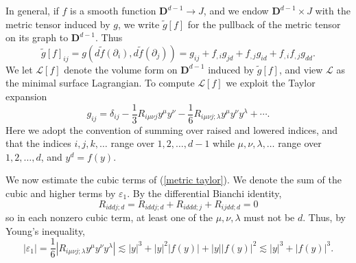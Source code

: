 \documentclass[reqno,12pt,letterpaper]{amsart}
\newcommand{\DD}{\mathbf{D}}
\theoremstyle{definition}
\numberwithin{equation}{section}
\begin{document}
In general, if $f$ is a smooth function $\DD^{d - 1} \to J$, and we endow $\DD^{d - 1} \times J$ with the metric tensor induced by $g$, we write $\tilde g[f]$ for the pullback of the metric tensor on its graph to $\DD^{d - 1}$.
Thus
\begin{equation}\label{induced metric}
\tilde g[f]_{ij} = g(d\tilde f(\partial_i), d\tilde f(\partial_j)) = g_{ij} + f_{,i}g_{jd} + f_{,j}g_{id} + f_{,i}f_{,j} g_{dd}.
\end{equation}
We let $\mathscr L[f]$ denote the volume form on $\DD^{d - 1}$ induced by $\tilde g[f]$, and view $\mathscr L$ as the minimal surface Lagrangian.
To compute $\mathscr L[f]$ we exploit the Taylor expansion
\begin{equation}\label{metric taylor}
g_{ij} = \delta_{ij} - \frac{1}{3} R_{i\mu\nu j} y^\mu y^\nu - \frac{1}{6} R_{i\mu\nu j;\lambda} y^\mu y^\nu y^\lambda + \cdots.
\end{equation}
Here we adopt the convention of summing over raised and lowered indices, and that the indices $i,j,k, \dots$ range over $1, 2, \dots, d - 1$ while $\mu, \nu, \lambda, \dots$ range over $1, 2, \dots, d$, and $y^d = f(y)$.

We now estimate the cubic terms of (\ref{metric taylor}).
We denote the sum of the cubic and higher terms by $\varepsilon_1$.
By the differential Bianchi identity,
$$R_{iddj;d} = R_{iddj;d} + R_{iddd;j} + R_{ijdd;d} = 0$$
so in each nonzero cubic term, at least one of the $\mu,\nu,\lambda$ must not be $d$.
Thus, by Young's inequality,
\begin{equation}\label{first error}
|\varepsilon_1| = \frac{1}{6} |R_{i\mu\nu j;\lambda} y^\mu y^\nu y^\lambda| \lesssim |y|^3 + |y|^2 |f(y)| + |y| |f(y)|^2 \lesssim |y|^3 + |f(y)|^3.
\end{equation}
\end{document}
